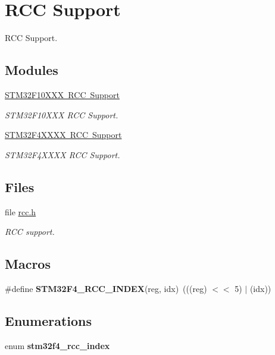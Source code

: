\hypertarget{group__stm32f4__rcc}{}\section{R\+CC Support}
\label{group__stm32f4__rcc}


R\+CC Support.  


\subsection*{Modules}
\begin{DoxyCompactItemize}
\item 
\mbox{\hyperlink{group__stm32f10xxx__rcc}{S\+T\+M32\+F10\+X\+X\+X R\+C\+C Support}}
\begin{DoxyCompactList}\small\item\em S\+T\+M32\+F10\+X\+XX R\+CC Support. \end{DoxyCompactList}\item 
\mbox{\hyperlink{group__stm32f4xxxx__rcc}{S\+T\+M32\+F4\+X\+X\+X\+X R\+C\+C Support}}
\begin{DoxyCompactList}\small\item\em S\+T\+M32\+F4\+X\+X\+XX R\+CC Support. \end{DoxyCompactList}\end{DoxyCompactItemize}
\subsection*{Files}
\begin{DoxyCompactItemize}
\item 
file \mbox{\hyperlink{rcc_8h}{rcc.\+h}}
\begin{DoxyCompactList}\small\item\em R\+CC support. \end{DoxyCompactList}\end{DoxyCompactItemize}
\subsection*{Macros}
\begin{DoxyCompactItemize}
\item 
\mbox{\label{group__stm32f4__rcc_ga73be2782601a2adb15d62709e23298ae}} 
\#define {\bfseries S\+T\+M32\+F4\+\_\+\+R\+C\+C\+\_\+\+I\+N\+D\+EX}(reg,  idx)~(((reg) $<$$<$ 5) $\vert$ (idx))
\end{DoxyCompactItemize}
\subsection*{Enumerations}
\begin{DoxyCompactItemize}
\item 
\mbox{\label{group__stm32f4__rcc_ga661f1bcf88b9b96682047e95f7fdaeb7}} 
enum {\bfseries stm32f4\+\_\+rcc\+\_\+index} 
\end{DoxyCompactItemize}
